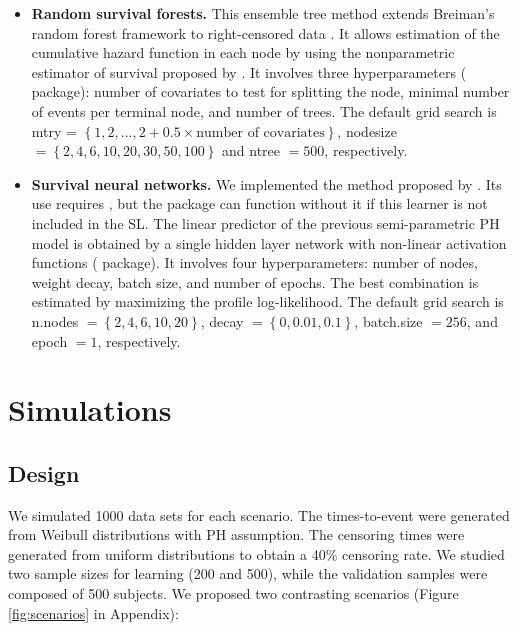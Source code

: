\begin{itemize}
\item
  \textbf{Random survival forests.} This ensemble tree method extends Breiman's random forest framework to right-censored data \citep{ishwaranRandomSurvivalForests2008a}. It allows estimation of the cumulative hazard function in each node by using the nonparametric estimator of survival proposed by \citet{aalen1979}. It involves three hyperparameters ( package): number of covariates to test for splitting the node, minimal number of events per terminal node, and number of trees. The default grid search is \textsf{mtry} = \(\left \lbrace 1,2,...,2+0.5\times \textrm{number of covariates} \right \rbrace\), \textsf{nodesize} \(= \left \lbrace 2, 4, 6, 10, 20, 30, 50, 100 \right \rbrace\) and \textsf{ntree} \(= 500\), respectively.
\item
  \textbf{Survival neural networks.} We implemented the method proposed by \citet{katzmanDeepSurvPersonalizedTreatment2018a}. Its use requires , but the  package can function without it if this learner is not included in the SL. The linear predictor of the previous semi-parametric PH model is obtained by a single hidden layer network with non-linear activation functions ( package). It involves four hyperparameters: number of nodes, weight decay, batch size, and number of epochs. The best combination is estimated by maximizing the profile log-likelihood. The default grid search is \textsf{n.nodes} \(= \left \lbrace 2, 4, 6, 10, 20 \right \rbrace\), \textsf{decay} \(= \left \lbrace 0, 0.01, 0.1 \right \rbrace\), \textsf{batch.size} \(= 256\), and \textsf{epoch} \(= 1\), respectively.
\end{itemize}

\hypertarget{simulations}{%
\section{Simulations}\label{simulations}}

\hypertarget{design}{%
\subsection{Design}\label{design}}

We simulated 1000 data sets for each scenario. The times-to-event were generated from Weibull distributions with PH assumption. The censoring times were generated from uniform distributions to obtain a 40\% censoring rate. We studied two sample sizes for learning (200 and 500), while the validation samples were composed of 500 subjects. We proposed two contrasting scenarios (Figure \ref{fig:scenarios} in Appendix):

